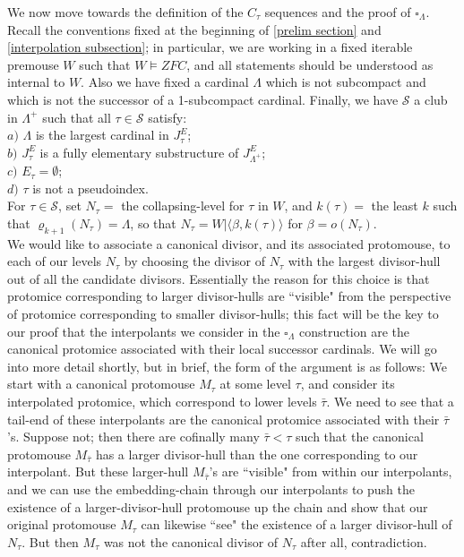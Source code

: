 \documentclass[12pt]{article}
\begin{document}
We now move towards the definition of the $C_\tau$ sequences and the proof of $\square_\Lambda$.  Recall the conventions fixed at the beginning of \ref{prelim section} and \ref{interpolation subsection}; in particular, we are working in a fixed iterable premouse $W$ such that $W \models ZFC$, and all statements should be understood as internal to $W$.  Also we have fixed a cardinal $\Lambda$ which is not subcompact and which is not the successor of a 1-subcompact cardinal.  Finally, we have $\mathcal{S}$ a club in $\Lambda^+$ such that all $\tau \in \mathcal{S}$ satisfy:\\

\indent $a)$ $\Lambda$ is the largest cardinal in $J_\tau^E$;\\

\indent $b)$ $J_\tau^E$ is a fully elementary substructure of $J_{\Lambda^+}^E$;\\

\indent $c)$ $E_\tau = \emptyset$;\\

\indent $d)$ $\tau$ is not a pseudoindex.\\


For $\tau \in \mathcal{S}$, set $N_\tau =$ the collapsing-level for $\tau$ in $W$, and $k(\tau) =$ the least $k$ such that $\varrho_{k+1}( N_\tau )  = \Lambda$, so that $N_\tau = W  |  \langle \beta , k(\tau) \rangle$ for $\beta = o (N_\tau )$.\\

We would like to associate a canonical divisor, and its associated protomouse, to each of our levels $N_\tau$ by choosing the divisor of $N_\tau$ with the largest divisor-hull out of all the candidate divisors.  Essentially the reason for this choice is that protomice corresponding to larger divisor-hulls are ``visible" from the perspective of protomice corresponding to smaller divisor-hulls; this fact will be the key to our proof that the interpolants we consider in the $\square_\Lambda$ construction are the canonical protomice associated with their local successor cardinals.  We will go into more detail shortly, but in brief, the form of the argument is as follows: We start with a canonical protomouse $M_\tau$ at some level $\tau$, and consider its interpolated protomice, which correspond to lower levels $\bar{\tau}$.  We need to see that a tail-end of these interpolants are the canonical protomice associated with their $\bar{\tau}$'s.  Suppose not; then there are cofinally many $\bar{\tau} < \tau$ such that the canonical protomouse $M_{\bar{\tau}}$ has a larger divisor-hull than the one corresponding to our interpolant.  But these larger-hull $M_{\bar{\tau}}$'s are ``visible" from within our interpolants, and we can use the embedding-chain through our interpolants to push the existence of a larger-divisor-hull protomouse up the chain and show that our original protomouse $M_\tau$ can likewise ``see" the existence of a larger divisor-hull of $N_\tau$.  But then $M_\tau$ was not the canonical divisor of $N_\tau$ after all, contradiction.\\
\end{document}
